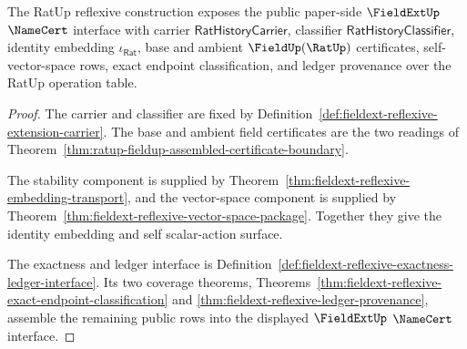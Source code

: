 \begin{theorem}
\label{thm:fieldext-reflexive-public-namecert-interface}
The RatUp reflexive construction exposes the public paper-side
$\FieldExtUp$ $\NameCert$ interface with carrier
$\mathsf{RatHistoryCarrier}$, classifier
$\mathsf{RatHistoryClassifier}$, identity embedding
$\iota_{\mathsf{Rat}}$, base and ambient $\FieldUp(\RatUp)$ certificates,
self-vector-space rows, exact endpoint classification, and ledger
provenance over the RatUp operation table.
\end{theorem}
\begin{proof}
The carrier and classifier are fixed by
Definition~\ref{def:fieldext-reflexive-extension-carrier}. The base and
ambient field certificates are the two readings of
Theorem~\ref{thm:ratup-fieldup-assembled-certificate-boundary}.

The stability component is supplied by
Theorem~\ref{thm:fieldext-reflexive-embedding-transport}, and the
vector-space component is supplied by
Theorem~\ref{thm:fieldext-reflexive-vector-space-package}. Together they
give the identity embedding and self scalar-action surface.

The exactness and ledger interface is
Definition~\ref{def:fieldext-reflexive-exactness-ledger-interface}. Its two
coverage theorems,
Theorems~\ref{thm:fieldext-reflexive-exact-endpoint-classification} and
\ref{thm:fieldext-reflexive-ledger-provenance}, assemble the remaining
public rows into the displayed $\FieldExtUp$ $\NameCert$ interface.
\end{proof}

